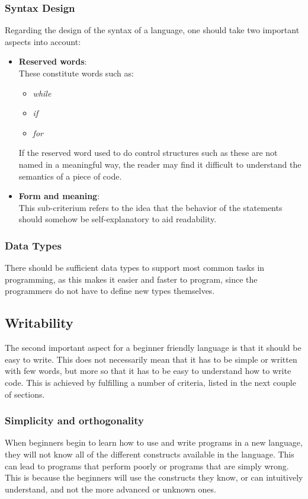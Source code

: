 \subsubsection{Syntax Design}
Regarding the design of the syntax of a language, one should take two important aspects into account:
\begin{itemize}
    \item \textbf{Reserved words}:\\
    These constitute words such as:
    \begin{itemize}
        \item \textit{while}
        \item \textit{if}
        \item \textit{for}
    \end{itemize}
    If the reserved word used to do control structures such as these are not named in a meaningful way, the reader may find it difficult to understand the semantics of a piece of code.
    \item \textbf{Form and meaning}:\\
    This sub-criterium refers to the idea that the behavior of the statements should somehow be self-explanatory to aid readability. 
\end{itemize}
\subsubsection{Data Types}
There should be sufficient data types to support most common tasks in programming, as this makes it easier and faster to program, since the programmers do not have to define new types themselves.
\subsection{Writability}
The second important aspect for a beginner friendly language is that it should be easy to write. This does not necessarily mean that it has to be simple or written with few words, but more so that it has to be easy to understand how to write code. This is achieved by fulfilling a number of criteria, listed in the next couple of sections.
\subsubsection{Simplicity and orthogonality}
When beginners begin to learn how to use and write programs in a new language, they will not know all of the different constructs available in the language. This can lead to programs that perform poorly or programs that are simply wrong. This is because the beginners will use the constructs they know, or can intuitively understand, and not the more advanced or unknown ones.
